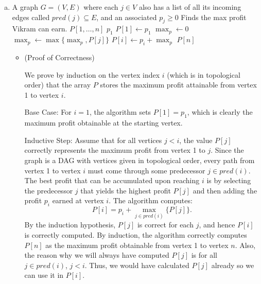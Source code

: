 \documentclass[12pt, letterpaper]{article}
\theoremstyle{definition}
\begin{document}
\begin{enumerate}[(a)]
    \item \begin{algorithm}[H]
        \caption{Max Profit}
        \begin{algorithmic}[1]
        \Require A graph $G=(V,E)$ where each $j \in V$ also has a list of all its incoming edges called $pred(j) \subseteq E$, and an associated $p_j \geq 0$
        \Ensure Finds the max profit Vikram can earn.
            \State $P[1,\dots,n]$
                \State \Return $p_1$
            \EndIf
            \State $P[1] \gets p_1$
                \State $\max_p \gets 0$
                    \State $\max_p \gets \max\{\max_p, P[j]\}$ 
                \EndFor
            \State $P[i] \gets p_i + \max_p$
            \EndFor
            \State \Return $P[n]$
        \EndFunction
        \end{algorithmic}
        \end{algorithm}
        \begin{itemize}
            \item (Proof of Correctness)
            
            We prove by induction on the vertex index \(i\) (which is in topological order) that the array \(P\) stores the maximum profit attainable from vertex 1 to vertex \(i\). 
            
           Base Case: For \(i = 1\), the algorithm sets \(P[1] = p_1\), which is clearly the maximum profit obtainable at the starting vertex.
            
           Inductive Step: Assume that for all vertices \(j < i\), the value \(P[j]\) correctly represents the maximum profit from vertex 1 to \(j\). Since the graph is a DAG with vertices given in topological order, every path from vertex 1 to vertex \(i\) must come through some predecessor \(j \in pred(i)\). The best profit that can be accumulated upon reaching \(i\) is by selecting the predecessor \(j\) that yields the highest profit \(P[j]\) and then adding the profit \(p_i\) earned at vertex \(i\). The algorithm computes:
              \[
              P[i] = p_i + \max_{j \in pred(i)} \{ P[j] \}.
              \]
              By the induction hypothesis, \(P[j]\) is correct for each \(j\), and hence \(P[i]\) is correctly computed. By induction, the algorithm correctly computes \(P[n]\) as the maximum profit obtainable from vertex 1 to vertex \(n\).
              Also, the reason why we will always have computed $P[j]$ is for all $j \in pred(i)$, $j<i$. Thus, we would have calculated $P[j]$ already so we can use it in $P[i]$.
            

\end{itemize}
\end{enumerate}
\end{document}

